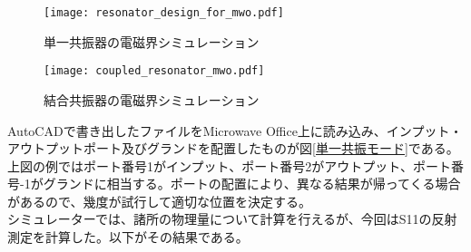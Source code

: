         \begin{figure}[H]
            \begin{minipage}[t]{0.5\columnwidth}
                \centering
                \texttt{[image: resonator\_design\_for\_mwo.pdf]}
                \caption{単一共振器の電磁界シミュレーション}
                \label{単一共振モード}
            \end{minipage}%
            \begin{minipage}[t]{0.5\columnwidth}
                \centering
                \texttt{[image: coupled\_resonator\_mwo.pdf]}
                \caption{結合共振器の電磁界シミュレーション}
                \label{結合共振モード}
            \end{minipage}
        \end{figure}
        AutoCADで書き出したファイルをMicrowave Office上に読み込み、インプット・アウトプットポート及びグランドを配置したものが図\ref*{単一共振モード}である。上図の例ではポート番号1がインプット、ポート番号2がアウトプット、ポート番号-1がグランドに相当する。ポートの配置により、異なる結果が帰ってくる場合があるので、幾度が試行して適切な位置を決定する。\\
        シミュレーターでは、諸所の物理量について計算を行えるが、今回はS11の反射測定を計算した。以下がその結果である。
        

